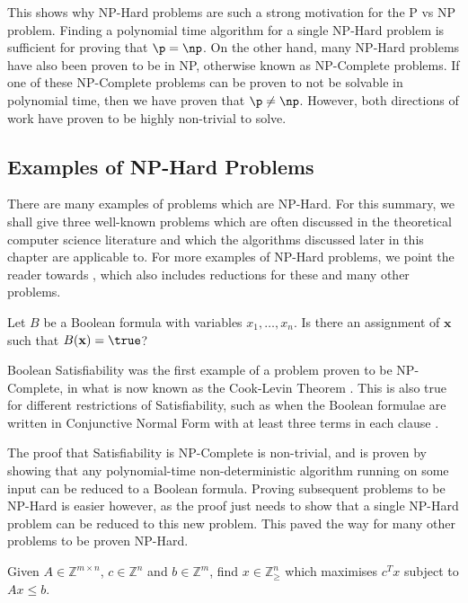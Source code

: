 This shows why NP-Hard problems are such a strong motivation for the P vs NP problem. Finding a polynomial time algorithm for a single NP-Hard problem is sufficient for proving that $\p = \np$. On the other hand, many NP-Hard problems have also been proven to be in NP, otherwise known as NP-Complete problems. If one of these NP-Complete problems can be proven to not be solvable in polynomial time, then we have proven that $\p \neq \np$. However, both directions of work have proven to be highly non-trivial to solve.

\subsection{Examples of NP-Hard Problems}

There are many examples of problems which are NP-Hard. For this summary, we shall give three well-known problems which are often discussed in the theoretical computer science literature and which the algorithms discussed later in this chapter are applicable to. For more examples of NP-Hard problems, we point the reader towards \cite{karp1972, garey1979}, which also includes reductions for these and many other problems.

\begin{problem}
Let $B$ be a Boolean formula with variables $x_1,\dots,x_n$. Is there an assignment of $\mathbf{x}$ such that $B(\mathbf{x}) = \true$?
\end{problem}

Boolean Satisfiability was the first example of a problem proven to be NP-Complete, in what is now known as the Cook-Levin Theorem \cite{cook1971}. This is also true for different restrictions of Satisfiability, such as when the Boolean formulae are written in Conjunctive Normal Form with at least three terms in each clause \cite{karp1972}.

The proof that Satisfiability is NP-Complete is non-trivial, and is proven by showing that any polynomial-time non-deterministic algorithm running on some input can be reduced to a Boolean formula. Proving subsequent problems to be NP-Hard is easier however, as the proof just needs to show that a single NP-Hard problem can be reduced to this new problem. This paved the way for many other problems to be proven NP-Hard.

\begin{problem}
Given $A \in \mathbb{Z}^{m\times n}$, $c \in \mathbb{Z}^n$ and $b \in \mathbb{Z}^m$, find $x\in\mathbb{Z}_\geq^n$ which maximises $c^Tx$ subject to $Ax \leq b$.
\end{problem}

